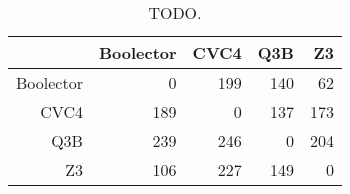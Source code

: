 \begin{table}[ht]
\centering
\begin{tabular}{rrrrr}
  \toprule
 & Boolector & CVC4 & Q3B & Z3 \\ 
  \midrule
Boolector &   0 & 199 & 140 &  62 \\ 
  CVC4 & 189 &   0 & 137 & 173 \\ 
  Q3B & 239 & 246 &   0 & 204 \\ 
  Z3 & 106 & 227 & 149 &   0 \\ 
   \bottomrule
\end{tabular}
\caption{TODO.} 
\end{table}

